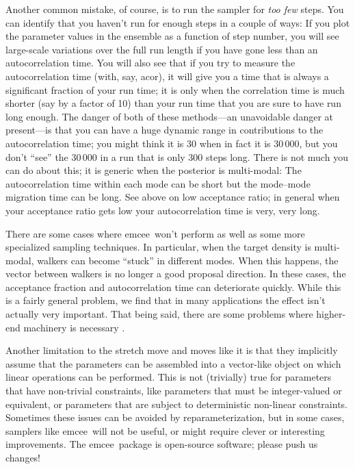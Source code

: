 \documentclass[12pt,preprint]{aastex}
\newcommand{\project}[1]{{\sffamily #1}}
\newcommand{\acor}{\project{acor}}
\newcommand{\thisplain}{emcee}
\newcommand{\this}{\project{\thisplain}}
\begin{document}
Another common mistake, of course, is to run the sampler for \emph{too
  few} steps.  You can identify that you haven't run for enough steps
in a couple of ways: If you plot the parameter values in the ensemble
as a function of step number, you will see large-scale variations over
the full run length if you have gone less than an autocorrelation
time.  You will also see that if you try to measure the
autocorrelation time (with, say, \acor), it will give you a time that
is always a significant fraction of your run time; it is only when the
correlation time is much shorter (say by a factor of 10) than your run
time that you are sure to have run long enough.  The danger of both of
these methods---an unavoidable danger at present---is that you can
have a huge dynamic range in contributions to the autocorrelation
time; you might think it is 30 when in fact it is 30\,000, but you
don't ``see'' the 30\,000 in a run that is only 300 steps long.  There
is not much you can do about this; it is generic when the posterior is
multi-modal: The autocorrelation time within each mode can be short but
the mode--mode migration time can be long.  See above on low
acceptance ratio; in general when your acceptance ratio gets low your
autocorrelation time is very, very long.

There are some cases where \this\ won't perform as well as some
more specialized sampling techniques. In particular, when the target density
is multi-modal, walkers can become ``stuck'' in different modes. When
this happens, the vector between walkers is no longer a good proposal
direction. In these cases, the acceptance fraction and autocorrelation
time can deteriorate quickly. While this is a fairly general problem, we
find that in many applications the effect isn't actually very important.
That being said, there are some problems where higher-end machinery
\citep[such as][Hou et al.\ forthcoming]{dnest} is necessary \citep[see, for
example,][]{brewer2012,vh2013}.

Another limitation to the stretch move and moves like it is
that they implicitly assume that the parameters can be assembled into
a vector-like object on which linear operations can be performed.
This is not (trivially) true for parameters that have non-trivial
constraints, like parameters that must be integer-valued or
equivalent, or parameters that are subject to deterministic non-linear
constraints. Sometimes these issues can be avoided by
reparameterization, but in some cases, samplers like \this\ will not
be useful, or might require clever or interesting improvements. The
\this\ package is open-source software; please push us changes!
\end{document}
